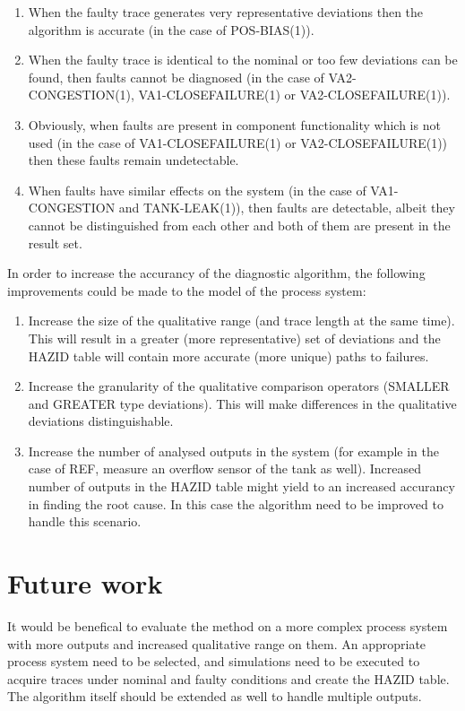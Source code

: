 \documentclass[conference]{IEEEtran}
\begin{document}
\begin{enumerate}
\item When the faulty trace generates very representative deviations then the algorithm is accurate (in the case of POS-BIAS(1)).
\item When the faulty trace is identical to the nominal or too few deviations can be found, then faults cannot be diagnosed (in the case of VA2-CONGESTION(1), VA1-CLOSEFAILURE(1) or VA2-CLOSEFAILURE(1)).
\item Obviously, when faults are present in component functionality which is not used (in the case of VA1-CLOSEFAILURE(1) or VA2-CLOSEFAILURE(1)) then these faults remain undetectable.
\item When faults have similar effects on the system (in the case of VA1-CONGESTION and TANK-LEAK(1)), then faults are detectable, albeit they cannot be distinguished from each other and both of them are present in the result set.
\end{enumerate}

In order to increase the accurancy of the diagnostic algorithm, the following improvements could be made to the model of the process system:
\begin{enumerate}
\item Increase the size of the qualitative range (and trace length at the same time). This will result in a greater (more representative) set of deviations and the HAZID table will contain more accurate (more unique) paths to failures.
\item Increase the granularity of the qualitative comparison operators (SMALLER and GREATER type deviations). This will make differences in the qualitative deviations distinguishable.
\item Increase the number of analysed outputs in the system (for example in the case of REF, measure an overflow sensor of the tank as well). Increased number of outputs in the HAZID table might yield to an increased accurancy in finding the root cause. In this case the algorithm need to be improved to handle this scenario.
\end{enumerate}

\section {Future work}
It would be benefical to evaluate the method on a more complex process system with more outputs and increased qualitative range on them. An appropriate process system need to be selected, and simulations need to be executed to acquire traces under nominal and faulty conditions and create the HAZID table. The algorithm itself should be extended as well to handle multiple outputs.
\end{document}

